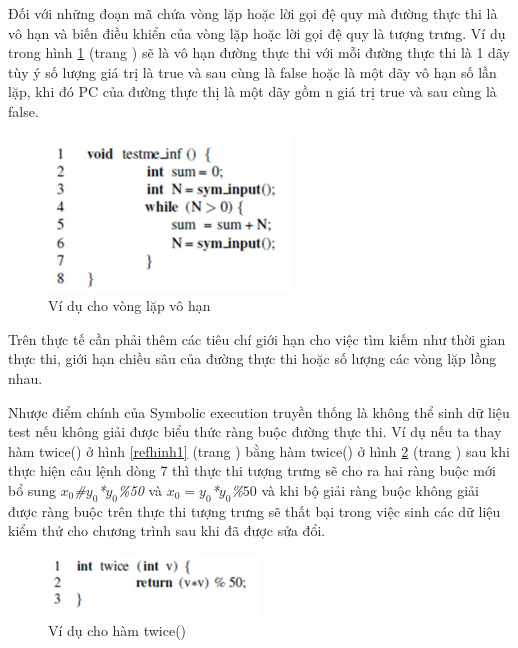 \documentclass[12pt,a4paper]{report}
\begin{document}
\indent Đối với những đoạn mã chứa vòng lặp hoặc lời gọi đệ quy mà đường thực thi là vô hạn và biến điều khiển của vòng lặp hoặc lời gọi đệ quy là tượng trưng. Ví dụ trong hình \ref{refhinh3} (trang \pageref{refhinh3}) sẽ là vô hạn đường thực thi với mỗi đường thực thi là 1 dãy tùy ý số lượng giá trị là true và sau cùng là false hoặc là một dãy vô hạn số lần lặp, khi đó PC của đường thực thị là một dãy gồm n giá trị true và sau cùng là false. \newpage

\begin{figure}[ht]
\begin{center}
\includegraphics{hinhanh/hinh3}
\end{center}
\caption{Ví dụ cho vòng lặp vô hạn}
\label{refhinh3}
\end{figure}

\indent Trên thực tế cần phải thêm các tiêu chí giới hạn cho việc tìm kiếm như thời gian thực thi, giới hạn chiều sâu của đường thực thi hoặc số lượng các vòng lặp lồng nhau.

\indent Nhược điểm chính của Symbolic execution truyền thống là không thể sinh dữ liệu test nếu không giải được biểu thức ràng buộc đường thực thi. Ví dụ nếu ta thay hàm twice() ở hình \ref{refhinh1} (trang \pageref{refhinh1}) bằng hàm twice() ở hình \ref{refhinh4} (trang \pageref{refhinh4}) sau khi thực hiện câu lệnh dòng 7 thì thực thi tượng trưng sẽ cho ra hai ràng buộc mới bổ sung \textit{$x_0$\#$y_0$*$y_0$\%50} và \textit{$x_0=y_0$*$y_0$\%$50$} và khi bộ giải ràng buộc không giải được ràng buộc trên thực thi tượng trưng sẽ thất bại trong việc sinh các dữ liệu kiểm thử cho chương trình sau khi đã được sửa đổi.

\begin{figure}[ht]
\begin{center}
\includegraphics{hinhanh/hinh4}
\end{center}
\caption{Ví dụ cho hàm twice()}
\label{refhinh4}
\end{figure}
\end{document}
